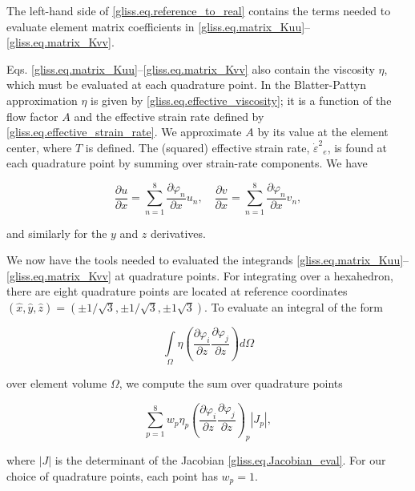 \noindent
The left-hand side of \eqref{gliss.eq.reference_to_real} contains the terms needed to evaluate
element matrix coefficients in \eqref{gliss.eq.matrix_Kuu}--\eqref{gliss.eq.matrix_Kvv}.

Eqs. \eqref{gliss.eq.matrix_Kuu}--\eqref{gliss.eq.matrix_Kvv} also contain the viscosity $\eta$,
which must be evaluated at each quadrature point.
In the Blatter-Pattyn approximation $\eta$ is given by \eqref{gliss.eq.effective_viscosity};
it is a function of the flow factor $A$ and the effective strain rate defined by \eqref{gliss.eq.effective_strain_rate}.
We approximate $A$ by its value at the element center, where $T$ is defined.
The (squared) effective strain rate, ${{\dot{\varepsilon }}^{2}}_{e}$, is found at each quadrature point
by summing over strain-rate components.  We have

\begin{equation}
  \label{gliss.eq.strain_rates}
  \frac{\partial u}{\partial x}=\sum\limits_{n=1}^{8}{\frac{\partial {{\varphi }_{n}}}{\partial x}}{{u}_{n}}, \quad
  \frac{\partial v}{\partial x}=\sum\limits_{n=1}^{8}{\frac{\partial {{\varphi }_{n}}}{\partial x}}{{v}_{n}},
\end{equation}

\noindent
and similarly for the $y$ and $z$ derivatives.

We now have the tools needed to evaluated the integrands \eqref{gliss.eq.matrix_Kuu}--\eqref{gliss.eq.matrix_Kvv}
at quadrature points. For integrating over a hexahedron, there are eight quadrature points are located at
reference coordinates $(\hat{x},\hat{y},\hat{z}) = (\pm 1/\sqrt{3}, \pm 1/\sqrt{3}, \pm 1\sqrt{3})$.
To evaluate an integral of the form

\begin{equation}
  \int\limits_{\Omega }{\eta \left( \frac{\partial {{\varphi }_{i}}}{\partial z}\frac{\partial {{\varphi }_{j}}}{\partial z} \right)}d\Omega
\end{equation}

\noindent
over element volume $\Omega$, we compute the sum over quadrature points

\begin{equation}
  \label{gliss.eq.sum_over_qp}
  \sum\limits_{p=1}^{8}{{{w}_{p}}{{\eta }_{p}}{{\left( \frac{\partial {{\varphi }_{i}}}{\partial z}\frac{\partial {{\varphi }_{j}}}{\partial z} \right)}_{p}}}|J_{p}|,
\end{equation}

\noindent
where $|J|$ is the determinant of the Jacobian \eqref{gliss.eq.Jacobian_eval}. For our choice of quadrature points,
each point has $w_p = 1$.

